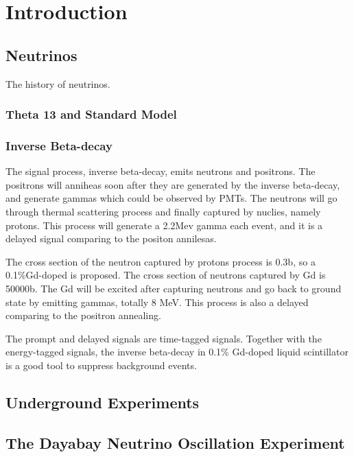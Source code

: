
\chapter{Introduction}

\section{Neutrinos}

The history of neutrinos.

\subsection{Theta 13 and Standard Model}

\subsection{Inverse Beta-decay}

The signal process, inverse beta-decay, emits neutrons and positrons.
The positrons will anniheas soon after they are generated by the inverse beta-decay,
and generate gammas which could be observed by PMTs. The neutrons will go through
thermal scattering process and finally captured by nuclies, namely protons. This
process will generate a 2.2Mev gamma each event, and it is a delayed signal comparing
to the positon annilesas.

The cross section of the neutron captured by protons process is 0.3b, so a 0.1\%Gd-doped
is proposed. The cross section of neutrons captured by Gd is 50000b. The Gd will be excited
after capturing neutrons and go back to ground state by emitting gammas, totally 8 MeV. This
process is also a delayed comparing to the positron annealing.


The prompt and delayed signals are time-tagged signals.
Together with the energy-tagged signals, the inverse beta-decay
in 0.1\% Gd-doped liquid scintillator is a good tool to suppress
background events.

\section{Underground Experiments}

\section{The Dayabay Neutrino Oscillation Experiment}



